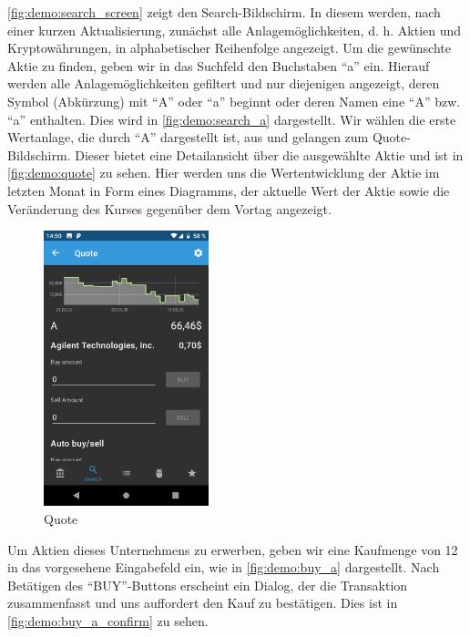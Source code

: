 \documentclass[a4paper]{article}
\begin{document}
\autoref{fig:demo:search_screen} zeigt den Search-Bildschirm. In diesem werden, nach einer kurzen Aktualisierung, zunächst alle Anlagemöglichkeiten, d. h. Aktien und Kryptowährungen, in alphabetischer Reihenfolge angezeigt. Um die gewünschte Aktie zu finden, geben wir in das Suchfeld den Buchstaben "`a"' ein. Hierauf werden alle Anlagemöglichkeiten gefiltert und nur diejenigen angezeigt, deren Symbol (Abkürzung) mit "`A"' oder "`a"' beginnt oder deren Namen eine "`A"' bzw. "`a"' enthalten. Dies wird in \autoref{fig:demo:search_a} dargestellt. Wir wählen die erste Wertanlage, die durch "`A"' dargestellt ist, aus und gelangen zum Quote-Bildschirm. Dieser bietet eine Detailansicht über die ausgewählte Aktie und ist in \autoref{fig:demo:quote} zu sehen. Hier werden uns die Wertentwicklung der Aktie im letzten Monat in Form eines Diagramms, der aktuelle Wert der Aktie sowie die Veränderung des Kurses gegenüber dem Vortag angezeigt.

\begin{figure}[H]
	\centering
	\includegraphics[height=8cm,keepaspectratio]{./images/demo/quote.png}
	\caption{Quote}
	\label{fig:demo:quote}
\end{figure}

Um Aktien dieses Unternehmens zu erwerben, geben wir eine Kaufmenge von 12 in das vorgesehene Eingabefeld ein, wie in \autoref{fig:demo:buy_a} dargestellt. Nach Betätigen des "`BUY"'-Buttons erscheint ein Dialog, der die Transaktion zusammenfasst und uns auffordert den Kauf zu bestätigen. Dies ist in \autoref{fig:demo:buy_a_confirm} zu sehen.
\end{document}
